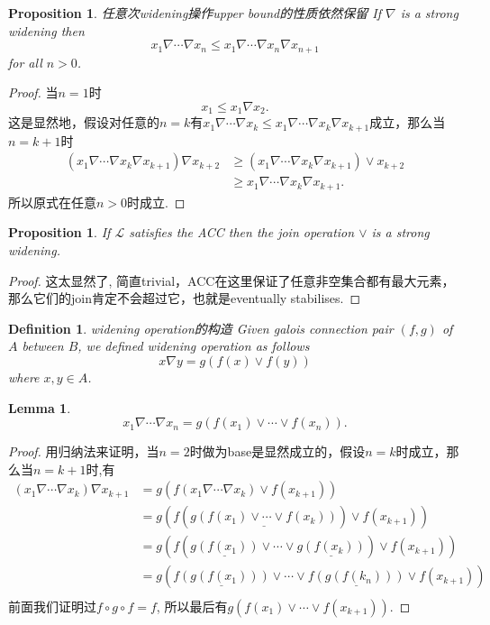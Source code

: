 \documentclass{article}
\newtheorem{lemma}[theorem]{Lemma}
\newtheorem{proposition}[theorem]{Proposition}
\newtheorem{definition}[theorem]{Definition}
\begin{document}
\begin{proposition}
\rm {\color{red} 任意次widening操作upper bound的性质依然保留} If $\nabla$ is a strong widening then
$$
x_1 \nabla \cdots \nabla x_n \leq x_1 \nabla \cdots \nabla x_n \nabla x_{n+1}
$$
for all $n > 0$.
\end{proposition}

\begin{proof}
当$n=1$时
$$
x_1 \leq x_1 \nabla x_2.
$$
这是显然地，假设对任意的$n = k$有$x_1 \nabla \cdots \nabla x_k \leq x_1 \nabla \cdots \nabla x_k \nabla x_{k+1}$成立，那么当$n = k+1$时
$$
\begin{aligned}
(x_1 \nabla \cdots \nabla x_k \nabla x_{k+1}) \nabla x_{k+2} &\geq (x_1 \nabla \cdots \nabla x_k \nabla x_{k+1}) \vee x_{k+2} \\
& \geq x_1 \nabla \cdots \nabla x_k \nabla x_{k+1}.
\end{aligned}
$$
所以原式在任意$n >0$时成立.
\end{proof}

\begin{proposition}
\rm If $\mathcal{L}$ satisfies the ACC then the join operation $\vee$ is a strong widening.
\end{proposition}

\begin{proof}
这太显然了, 简直trivial，ACC在这里保证了任意非空集合都有最大元素，那么它们的join肯定不会超过它，也就是eventually stabilises.
\end{proof}

\begin{definition}
\rm {\color{red} widening operation的构造} Given galois connection pair $(f,g)$ of $A$ between $B$, we defined widening operation as follows
$$
x \nabla y = g(f(x) \vee f(y)) 
$$
where $x,y \in A$.
\end{definition}

\begin{lemma}
$$
x_1 \nabla \cdots \nabla x_n = g(f(x_1) \vee \cdots \vee f(x_n)).
$$
\end{lemma}

\begin{proof}
用归纳法来证明，当$n=2$时做为base是显然成立的，假设$n=k$时成立，那么当$n=k+1$时,有
$$
\begin{aligned}
(x_1 \nabla \cdots \nabla x_k) \nabla x_{k+1} &= g(f(x_1 \nabla \cdots \nabla x_k) \vee f(x_{k+1})) \\
&= g(f(\underline{g(f(x_1) \vee \cdots \vee f(x_k))}) \vee f(x_{k+1})) \\
&= g(f( \underline{g(f(x_1))} \vee \cdots \vee \underline{g(f(x_k))}) \vee f(x_{k+1})) \\
&= g(\underline{f(g(f(x_1)))} \vee  \cdots  \vee \underline{f(g(f(k_n)))} \vee  f(x_{k+1})) \\
\end{aligned} 
$$
前面我们证明过$f\circ g \circ f = f$, 所以最后有$ g(f(x_1) \vee \cdots \vee f(x_{k+1}))$.
\end{proof}
\end{document}
